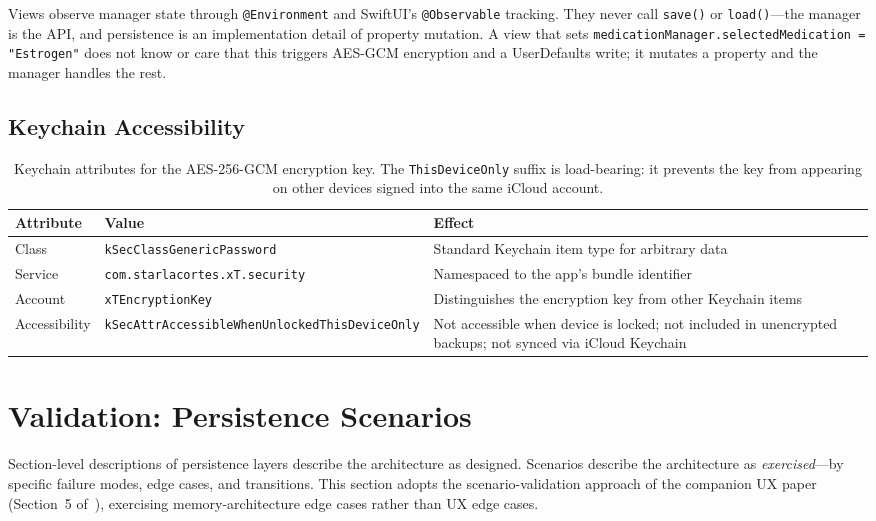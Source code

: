 \documentclass[11pt,a4paper]{article}
\newcommand{\code}[1]{\texttt{\small #1}}
\begin{document}
Views observe manager state through \code{@Environment} and SwiftUI's
\code{@Observable} tracking. They never call \code{save()} or
\code{load()}---the manager is the API, and persistence is an implementation
detail of property mutation. A view that sets
\code{medicationManager.selectedMedication = "Estrogen"} does not know or
care that this triggers AES-GCM encryption and a UserDefaults write; it
mutates a property and the manager handles the rest.

\subsection{Keychain Accessibility}
\label{sec:keychain_design}

\begin{table}[h]
\centering
\small
\begin{tabular}{@{}p{3.2cm}p{5.5cm}p{5.8cm}@{}}
\toprule
\textbf{Attribute} & \textbf{Value} & \textbf{Effect} \\
\midrule
Class & \code{kSecClassGenericPassword} &
  Standard Keychain item type for arbitrary data \\
Service & \code{com.starlacortes.xT.security} &
  Namespaced to the app's bundle identifier \\
Account & \code{xTEncryptionKey} &
  Distinguishes the encryption key from other Keychain items \\
Accessibility & \code{kSecAttrAccessibleWhenUnlockedThisDeviceOnly} &
  Not accessible when device is locked; not included in unencrypted
  backups; not synced via iCloud Keychain \\
\bottomrule
\end{tabular}
\caption{Keychain attributes for the AES-256-GCM encryption key. The
\code{ThisDeviceOnly} suffix is load-bearing: it prevents the key from
appearing on other devices signed into the same iCloud account.}
\label{tab:keychain}
\end{table}

\section{Validation: Persistence Scenarios}
\label{sec:scenarios}

Section-level descriptions of persistence layers describe the architecture
as designed. Scenarios describe the architecture as \emph{exercised}---by
specific failure modes, edge cases, and transitions. This section adopts the
scenario-validation approach of the companion UX paper (Section~5
of~\cite{xtux}), exercising memory-architecture edge cases rather than UX
edge cases.
\end{document}
